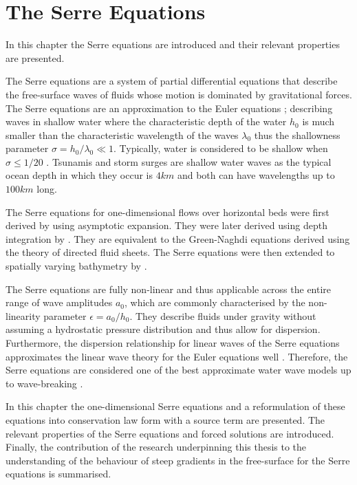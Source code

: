 
\chapter{The Serre Equations}
\label{chp:Serreeqns}
In this chapter the Serre equations are introduced and their relevant properties are presented.

The Serre equations are a system of partial differential equations that describe the free-surface waves of fluids whose motion is dominated by gravitational forces. The Serre equations are an approximation to the Euler equations \cite{Euler-1755-274}; describing waves in shallow water where the characteristic depth of the water $h_0$ is much smaller than the characteristic wavelength of the waves $\lambda_0$ thus the shallowness parameter $ \sigma = h_0 / \lambda_0  \ll 1 $. Typically, water is considered to be shallow when $\sigma  \le  1/ 20$ \cite{Sorenson-2006}. Tsunamis and storm surges are shallow water waves as the typical ocean depth in which they occur is $4km$ and both can have wavelengths up to $100km$ long.

The Serre equations for one-dimensional flows over horizontal beds were first derived by \citet{Serre-F-1953-857} using asymptotic expansion. They were later derived using depth integration by \citet{Su-Gardener-1969-536}. They are equivalent to the Green-Naghdi equations \cite{Green-Naghdi-1976-237} derived using the theory of directed fluid sheets. The Serre equations were then extended to spatially varying bathymetry by \citet{Seabra-Santos-etal-1987-117}. 

The Serre equations are fully non-linear and thus applicable across the entire range of wave amplitudes $a_0$, which are commonly characterised by the non-linearity parameter $\epsilon = a_0 / h_0$. They describe fluids under gravity without assuming a hydrostatic pressure distribution and thus allow for dispersion. Furthermore, the dispersion relationship for linear waves of the Serre equations approximates the linear wave theory for the Euler equations well \cite{Barthelemy-2004-315}. Therefore, the Serre equations are considered one of the best approximate water wave models up to wave-breaking \cite{Bonneton-Lannes-2009-16601,Bonneton-etal-2011-1479}. 

In this chapter the one-dimensional Serre equations and a reformulation of these equations into conservation law form with a source term are presented. The relevant properties of the Serre equations and forced solutions are introduced. Finally, the contribution of the research underpinning this thesis \cite{Pitt-2018-61} to the understanding of the behaviour of steep gradients in the free-surface for the Serre equations is summarised. 

